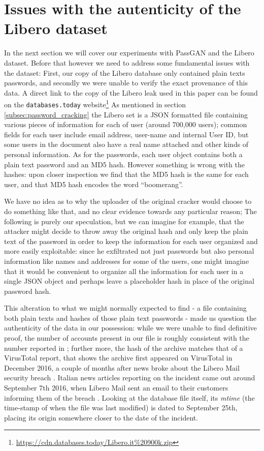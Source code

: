 \section{Issues with the autenticity of the Libero dataset}\label{sec:libero}
In the next section we will cover our experiments with PassGAN and the Libero dataset.
Before that however we need to address some fundamental issues with the dataset: First, our copy of the Libero database only contained plain texts passwords, and secondly we were unable to verify the exact provenance of this data.
A direct link to the copy of the Libero leak used in this paper can be found on the \texttt{databases.today} website\footnote{\url{https://cdn.databases.today/Libero.it\%20900k.zip}}
As mentioned in section \ref{subsec:password_cracking} the Libero set is a JSON formatted file containing various pieces of information for each of user (around 700,000 users); common fields for each user include email address, user-name and internal User ID, but some users in the document also have a real name attached and other kinds of personal information.  As for the passwords, each user object contains both a plain text password and an MD5 hash.
However something is wrong with the hashes: upon closer inspection we find that the MD5 hash is the same for each user, and that MD5 hash encodes the word \enquote{boomerang}.

We have no idea as to why the uploader of the original cracker would choose to do something like that, and no clear evidence towards any particular reason; The following is purely our speculation, but we can imagine for example, that the attacker might decide to throw away the original hash and only keep the plain text of the password in order to keep the information for each user organized and more easily exploitable: since he exfiltrated not just passwords but also personal information like names and addresses for some of the users, one might imagine that it would be convenient to organize all the information for each user in a single JSON object and perhaps leave a placeholder hash in place of the original password hash.

This alteration to what we might normally expected to find - a file containing both plain texts and hashes of those plain text passwords - made us question the authenticity of the data in our possession: while we were unable to find definitive proof, the number of accounts present in our file is roughly consistent with the number reported in \cite{libero_leak}; further more, the hash of the archive matches that of a VirusTotal report, that shows the archive first appeared on VirusTotal in December 2016, a couple of months after news broke about the Libero Mail security breach \cite{virus_total}.
Italian news articles reporting on the incident came out around September 7th 2016, when Libero Mail sent an email to their customers informing them of the breach \cite{libero-news-wired,libero-news-tomhw,libero-news-fanpage}.
Looking at the database file itself, its \emph{mtime} (the time-stamp of when the file was last modified) is dated to September 25th, placing its origin somewhere closer to the date of the incident. 

